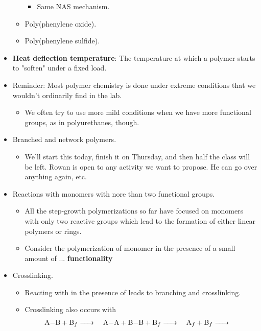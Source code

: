 \documentclass[../notes.tex]{subfiles}
\begin{document}
\begin{itemize}
\begin{itemize}
        \begin{itemize}
            \item Same NAS mechanism.
        \end{itemize}
        \item Poly(phenylene oxide).
        \item Poly(phenylene sulfide).
    \end{itemize}
    \item \textbf{Heat deflection temperature}: The temperature at which a polymer starts to "soften" under a fixed load.
    \item Reminder: Most polymer chemistry is done under extreme conditions that we wouldn't ordinarily find in the lab.
    \begin{itemize}
        \item We often try to use more mild conditions when we have more functional groups, as in polyurethanes, though.
    \end{itemize}
    \item Branched and network polymers.
    \begin{itemize}
        \item We'll start this today, finish it on Thursday, and then half the class will be left. Rowan is open to any activity we want to propose. He can go over anything again, etc.
    \end{itemize}
    \item Reactions with monomers with nore than two functional groups.
    \begin{itemize}
        \item All the step-growth polymerizations so far have focused on monomers with only two reactive groups which lead to the formation of either linear polymers or rings.
        \item Consider the polymerization of  monomer in the presence of a small amount of ... \textbf{functionality}
    \end{itemize}
    \item Crosslinking.
    \begin{itemize}
        \item Reacting  with  in the presence of  leads to branching and crosslinking.
        \item Crosslinking also occurs with
        \begin{align*}
            \ce{A-B + B_f} &\ce{->}&
            \ce{A-A + B-B + B_f} &\ce{->}&
            \ce{A_f + B_f} &\ce{->}

\end{align*}
\end{itemize}
\end{itemize}
\end{document}
